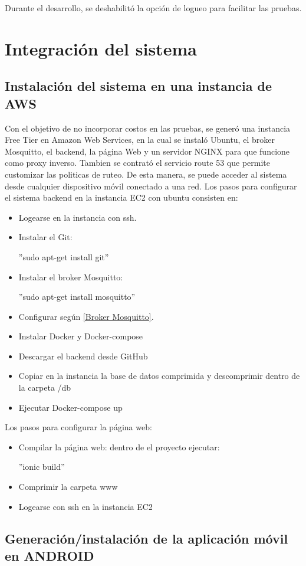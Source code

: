 Durante el desarrollo, se deshabilitó la opción de logueo para facilitar las pruebas. 

\section{Integración del sistema}
\subsection{Instalación del sistema en una instancia de AWS}
Con el objetivo de no incorporar costos en las pruebas, se generó una instancia Free Tier en Amazon Web Services, en la cual se instaló Ubuntu, el broker Mosquitto, el backend, la página Web y un servidor NGINX para que funcione como proxy inverso. Tambien se contrató el servicio route 53 que permite customizar las politicas de ruteo.
De esta manera, se puede acceder al sistema desde cualquier dispositivo móvil conectado a una red.
Los pasos para configurar el sistema backend en la instancia EC2 con ubuntu consisten en:

\begin{itemize}
\item Logearse en la instancia con ssh.
\item Instalar el Git:

	''sudo apt-get install git''
\item Instalar el broker Mosquitto:
	
	''sudo apt-get install mosquitto''
\item Configurar según \ref{Broker Mosquitto}.
\item Instalar Docker y Docker-compose
\item Descargar el backend desde GitHub
\item Copiar en la instancia la base de datos comprimida y descomprimir dentro de la carpeta /db
\item Ejecutar Docker-compose up
\end{itemize}

Los pasos para configurar la página web:
\begin{itemize}
\item Compilar la página web: dentro de el proyecto ejecutar:

''ionic build''
\item Comprimir la carpeta www
\item Logearse con ssh en la instancia EC2

\end{itemize}
\subsection{Generación/instalación de la aplicación móvil en ANDROID}

